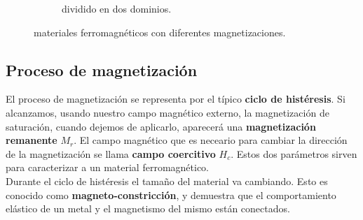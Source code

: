 \documentclass[12pt,a4paper]{book}
\numberwithin{equation}{section}
\numberwithin{figure}{section}
\begin{document}
\begin{figure}[h!]
\begin{subfigure}{0.45\linewidth}
\caption{dividido en dos dominios.}
\label{Fig:06-07-02-b}
\end{subfigure}
\caption{materiales ferromagnéticos con diferentes magnetizaciones.}
\end{figure}



\subsection{Proceso de magnetización}

El proceso de magnetización se representa por el típico \textbf{ciclo de histéresis}. Si alcanzamos, usando nuestro campo magnético externo, la magnetización de saturación, cuando dejemos de aplicarlo, aparecerá una \textbf{magnetización remanente} $M_r$. El campo magnético que es neceario para cambiar la dirección de la magnetización se llama \textbf{campo coercitivo} $H_c$. Estos dos parámetros sirven para caracterizar a un material ferromagnético. \\

Durante el ciclo de histéresis el tamaño del material va cambiando. Esto es conocido como \textbf{magneto-constricción}, y demuestra que el comportamiento elástico de un metal y el magnetismo del mismo están conectados. 

\end{document}
